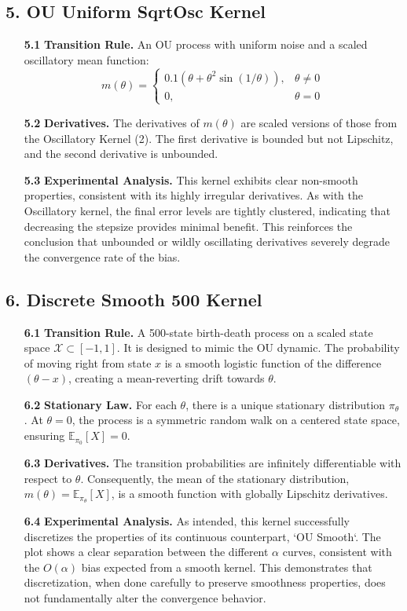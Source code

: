 \documentclass[a4paper]{article}
\begin{document}
\subsection*{5. OU Uniform SqrtOsc Kernel}
\begin{itemize}
	\item[\bfseries 5.1] \textbf{Transition Rule.} An OU process with uniform noise and a scaled oscillatory mean function:
	\[ m(\theta)= \begin{cases} 0.1\left(\theta+\theta^2\sin(1/\theta)\right), & \theta\neq0 \\ 0, & \theta=0 \end{cases} \]
	\item[\bfseries 5.2] \textbf{Derivatives.} The derivatives of \(m(\theta)\) are scaled versions of those from the Oscillatory Kernel (2). The first derivative is bounded but not Lipschitz, and the second derivative is unbounded.
	\item[\bfseries 5.3] \textbf{Experimental Analysis.} This kernel exhibits clear non-smooth properties, consistent with its highly irregular derivatives. As with the Oscillatory kernel, the final error levels are tightly clustered, indicating that decreasing the stepsize provides minimal benefit. This reinforces the conclusion that unbounded or wildly oscillating derivatives severely degrade the convergence rate of the bias.
\end{itemize}

\subsection*{6. Discrete Smooth 500 Kernel}
\begin{itemize}
	\item[\bfseries 6.1] \textbf{Transition Rule.} A 500-state birth-death process on a scaled state space \(\mathcal{X} \subset [-1, 1]\). It is designed to mimic the OU dynamic. The probability of moving right from state \(x\) is a smooth logistic function of the difference \((\theta - x)\), creating a mean-reverting drift towards \(\theta\).
	\item[\bfseries 6.2] \textbf{Stationary Law.} For each \(\theta\), there is a unique stationary distribution \(\pi_\theta\). At \(\theta=0\), the process is a symmetric random walk on a centered state space, ensuring \(\mathbb{E}_{\pi_0}[X]=0\).
	\item[\bfseries 6.3] \textbf{Derivatives.} The transition probabilities are infinitely differentiable with respect to \(\theta\). Consequently, the mean of the stationary distribution, \(m(\theta) = \mathbb{E}_{\pi_\theta}[X]\), is a smooth function with globally Lipschitz derivatives.
	\item[\bfseries 6.4] \textbf{Experimental Analysis.} As intended, this kernel successfully discretizes the properties of its continuous counterpart, `OU Smooth`. The plot shows a clear separation between the different \(\alpha\) curves, consistent with the \(O(\alpha)\) bias expected from a smooth kernel. This demonstrates that discretization, when done carefully to preserve smoothness properties, does not fundamentally alter the convergence behavior.
\end{itemize}
\end{document}
